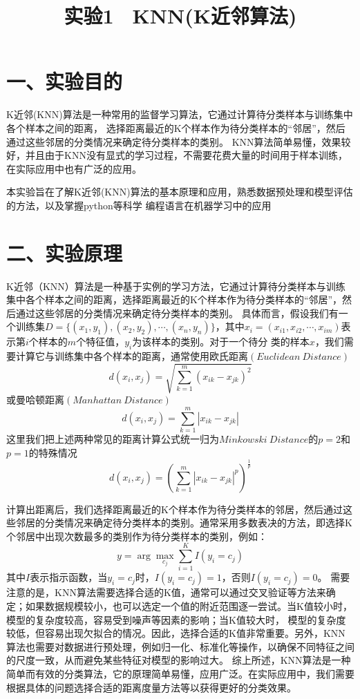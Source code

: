 \documentclass{article}
\begin{document}
\title*{\Huge \centering \vfill \textbf{实验1 \ KNN(K近邻算法)}}
\section*{\LARGE 一、实验目的}
K近邻(KNN)算法是一种常用的监督学习算法，它通过计算待分类样本与训练集中各个样本之间的距离，
选择距离最近的K个样本作为待分类样本的“邻居”，然后通过这些邻居的分类情况来确定待分类样本的类别。
KNN算法简单易懂，效果较好，并且由于KNN没有显式的学习过程，不需要花费大量的时间用于样本训练，
在实际应用中也有广泛的应用。


本实验旨在了解K近邻(KNN)算法的基本原理和应用，熟悉数据预处理和模型评估的方法，以及掌握python等科学
编程语言在机器学习中的应用

\section*{\LARGE 二、实验原理}
K近邻（KNN）算法是一种基于实例的学习方法，它通过计算待分类样本与训练集中各个样本之间的距离，选择距离最近的K个样本作为待分类样本的“邻居”，然后通过这些邻居的分类情况来确定待分类样本的类别。
具体而言，假设我们有一个训练集$D=\{(x_1,y_1),(x_2,y_2),\cdots,(x_n,y_n)\}$，其中$x_i=(x_{i1},x_{i2},\cdots,x_{im})$表示第$i$个样本的$m$个特征值，$y_i$为该样本的类别。对于一个待分
类的样本$x$，我们需要计算它与训练集中各个样本的距离，通常使用欧氏距离$(Euclidean\ Distance)$
$$d(x_i,x_j)=\sqrt{\sum_{k=1}^m(x_{ik}-x_{jk})^2}$$
或曼哈顿距离$(Manhattan\ Distance)$
$$d(x_i,x_j)={\sum_{k=1}^m|x_{ik}-x_{jk}|}$$
这里我们把上述两种常见的距离计算公式统一归为$Minkowski\ Distance$的$p=2$和$p=1$的特殊情况
$$d(x_i,x_j)={(\sum_{k=1}^m|x_{ik}-x_{jk}|^p)^{\frac{1}{p}}}$$


计算出距离后，我们选择距离最近的K个样本作为待分类样本的邻居，然后通过这些邻居的分类情况来确定待分类样本的类别。通常采用多数表决的方法，即选择K个邻居中出现次数最多的类别作为待分类样本的类别，例如：
$$y=\arg\max_{c_j}\sum_{i=1}^KI(y_i=c_j)$$
其中$I$表示指示函数，当$y_i=c_j$时，$I(y_i=c_j)=1$，否则$I(y_i=c_j)=0$。
需要注意的是，KNN算法需要选择合适的K值，通常可以通过交叉验证等方法来确定；如果数据规模较小，也可以选定一个值的附近范围逐一尝试。当K值较小时，模型的复杂度较高，容易受到噪声等因素的影响；当K值较大时，
模型的复杂度较低，但容易出现欠拟合的情况。因此，选择合适的K值非常重要。另外，KNN算法也需要对数据进行预处理，例如归一化、标准化等操作，以确保不同特征之间的尺度一致，从而避免某些特征对模型的影响过大。
综上所述，KNN算法是一种简单而有效的分类算法，它的原理简单易懂，应用广泛。在实际应用中，我们需要根据具体的问题选择合适的距离度量方法等以获得更好的分类效果。
\end{document}
